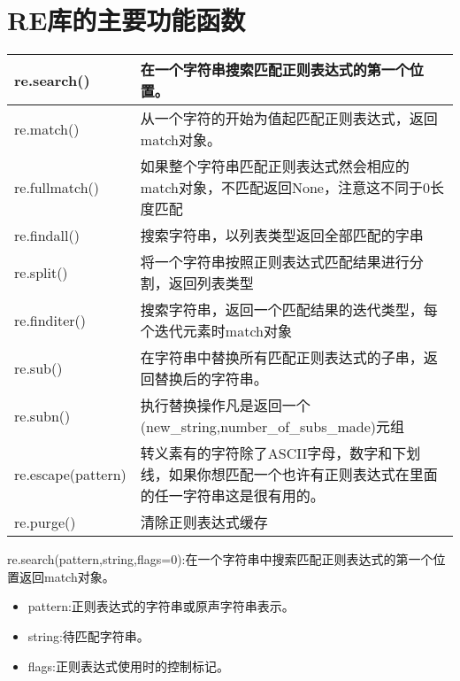 \section{RE库的主要功能函数}
\begin{center}
\begin{tabular}{|p{2cm}|p{8cm}|}
\hline
re.search()&在一个字符串搜索匹配正则表达式的第一个位置。\\
\hline
re.match()&从一个字符的开始为值起匹配正则表达式，返回match对象。\\
\hline
re.fullmatch()&如果整个字符串匹配正则表达式然会相应的match对象，不匹配返回None，注意这不同于0长度匹配\\
\hline
re.findall()&搜索字符串，以列表类型返回全部匹配的字串\\
\hline
re.split()&将一个字符串按照正则表达式匹配结果进行分割，返回列表类型\\
\hline
re.finditer()&搜索字符串，返回一个匹配结果的迭代类型，每个迭代元素时match对象\\
\hline
re.sub()&在字符串中替换所有匹配正则表达式的子串，返回替换后的字符串。\\
\hline
re.subn()&执行替换操作凡是返回一个(new\_string,number\_of\_subs\_made)元组\\
\hline
re.escape(pattern)&转义素有的字符除了ASCII字母，数字和下划线，如果你想匹配一个也许有正则表达式在里面的任一字符串这是很有用的。\\
\hline
re.purge()&清除正则表达式缓存\\
\hline
\end{tabular}
\end{center}
\newpage
re.search(pattern,string,flags=0):在一个字符串中搜索匹配正则表达式的第一个位置返回match对象。\newline
\begin{itemize}
\item pattern:正则表达式的字符串或原声字符串表示。
\item string:待匹配字符串。
\item flags:正则表达式使用时的控制标记。\newline
\end{itemize}
